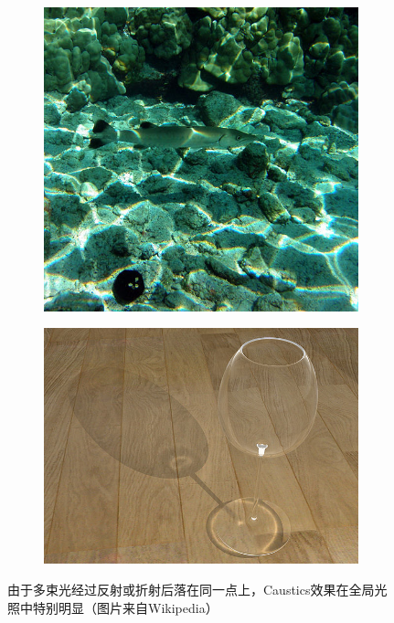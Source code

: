 \begin{figure}
\begin{fullwidth}
\begin{subfigure}[b]{0.19\thewidth}
		\includegraphics[width=1.\textwidth]{figures/intro/Caustics-3}
	\end{subfigure}	
	\begin{subfigure}[b]{0.246\thewidth}
		\includegraphics[width=1.\textwidth]{figures/intro/Caustics-4}
	\end{subfigure}
\caption{由于多束光经过反射或折射后落在同一点上，Caustics效果在全局光照中特别明显（图片来自Wikipedia）}
\label{f:intro-caustics}
\end{fullwidth}
\end{figure}

